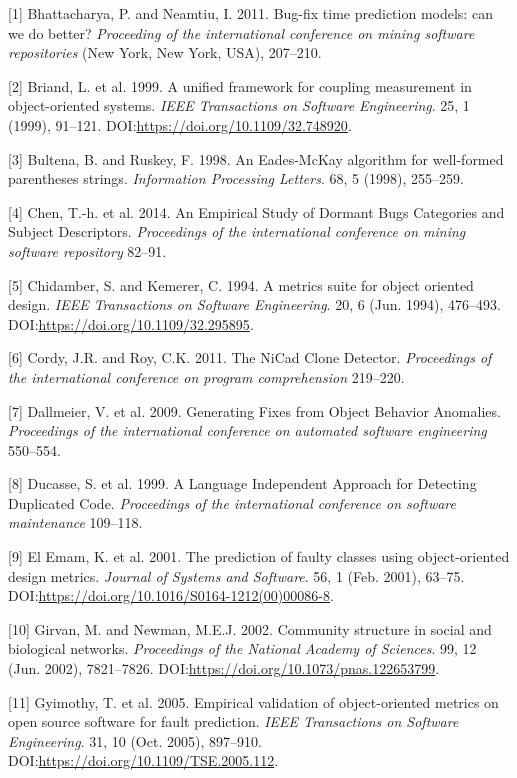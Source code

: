 \documentclass[sigconf]{acmart}
\begin{document}
\setlength{\parindent}{0pt} \setlength{\parskip}{0.5em}



[1] Bhattacharya, P. and Neamtiu, I. 2011. Bug-fix time prediction
models: can we do better? \emph{Proceeding of the international
conference on mining software repositories} (New York, New York, USA),
207--210.


[2] Briand, L. et al. 1999. A unified framework for coupling
measurement in object-oriented systems. \emph{IEEE Transactions on
Software Engineering}. 25, 1 (1999), 91--121.
DOI:\url{https://doi.org/10.1109/32.748920}.


[3] Bultena, B. and Ruskey, F. 1998. An Eades-McKay algorithm for
well-formed parentheses strings. \emph{Information Processing Letters}.
68, 5 (1998), 255--259.


[4] Chen, T.-h. et al. 2014. An Empirical Study of Dormant Bugs
Categories and Subject Descriptors. \emph{Proceedings of the
international conference on mining software repository} 82--91.


[5] Chidamber, S. and Kemerer, C. 1994. A metrics suite for object
oriented design. \emph{IEEE Transactions on Software Engineering}. 20, 6
(Jun. 1994), 476--493. DOI:\url{https://doi.org/10.1109/32.295895}.


[6] Cordy, J.R. and Roy, C.K. 2011. The NiCad Clone Detector.
\emph{Proceedings of the international conference on program
comprehension} 219--220.


[7] Dallmeier, V. et al. 2009. Generating Fixes from Object Behavior
Anomalies. \emph{Proceedings of the international conference on
automated software engineering} 550--554.


[8] Ducasse, S. et al. 1999. A Language Independent Approach for
Detecting Duplicated Code. \emph{Proceedings of the international
conference on software maintenance} 109--118.


[9] El Emam, K. et al. 2001. The prediction of faulty classes using
object-oriented design metrics. \emph{Journal of Systems and Software}.
56, 1 (Feb. 2001), 63--75.
DOI:\url{https://doi.org/10.1016/S0164-1212(00)00086-8}.


[10] Girvan, M. and Newman, M.E.J. 2002. Community structure in
social and biological networks. \emph{Proceedings of the National
Academy of Sciences}. 99, 12 (Jun. 2002), 7821--7826.
DOI:\url{https://doi.org/10.1073/pnas.122653799}.


[11] Gyimothy, T. et al. 2005. Empirical validation of
object-oriented metrics on open source software for fault prediction.
\emph{IEEE Transactions on Software Engineering}. 31, 10 (Oct. 2005),
897--910. DOI:\url{https://doi.org/10.1109/TSE.2005.112}.
\end{document}
